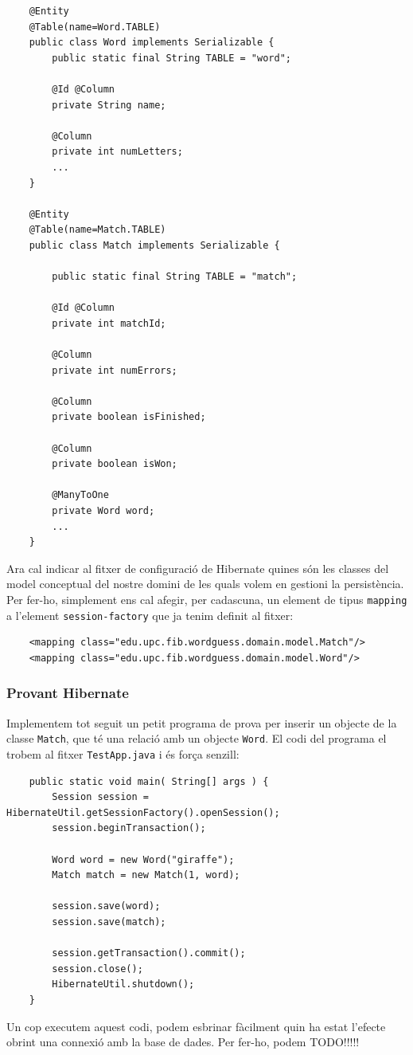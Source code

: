 \begin{verbatim}
    @Entity
    @Table(name=Word.TABLE)
    public class Word implements Serializable {
        public static final String TABLE = "word";
        
        @Id @Column
        private String name;
        
        @Column
        private int numLetters;
        ...
    }
    
    @Entity
    @Table(name=Match.TABLE)
    public class Match implements Serializable {
    
        public static final String TABLE = "match";
    	
        @Id @Column
        private int matchId;
    	
        @Column
        private int numErrors;
    	
        @Column
        private boolean isFinished;
    	
        @Column
        private boolean isWon;
    	
        @ManyToOne
        private Word word;
        ...
    }
\end{verbatim}

Ara cal indicar al fitxer de configuració de Hibernate quines són les classes del model conceptual del nostre domini de les quals volem en gestioni la persistència. Per fer-ho, simplement ens cal afegir, per cadascuna, un element de tipus \texttt{mapping} a l'element \texttt{session-factory} que ja tenim definit al fitxer:

\begin{verbatim}
    <mapping class="edu.upc.fib.wordguess.domain.model.Match"/>
    <mapping class="edu.upc.fib.wordguess.domain.model.Word"/>
\end{verbatim}

\subsubsection{Provant Hibernate}
Implementem tot seguit un petit programa de prova per inserir un objecte de la classe \texttt{Match}, que té una relació amb un objecte \texttt{Word}. El codi del programa el trobem al fitxer \texttt{TestApp.java} i és força senzill:

\begin{verbatim}
    public static void main( String[] args ) {
        Session session = HibernateUtil.getSessionFactory().openSession();
        session.beginTransaction();
        
        Word word = new Word("giraffe");
        Match match = new Match(1, word);
        
        session.save(word);
        session.save(match);
        
        session.getTransaction().commit();
        session.close();
        HibernateUtil.shutdown();
    }
\end{verbatim}

Un cop executem aquest codi, podem esbrinar fàcilment quin ha estat l'efecte obrint una connexió amb la base de dades. Per fer-ho, podem TODO!!!!!
